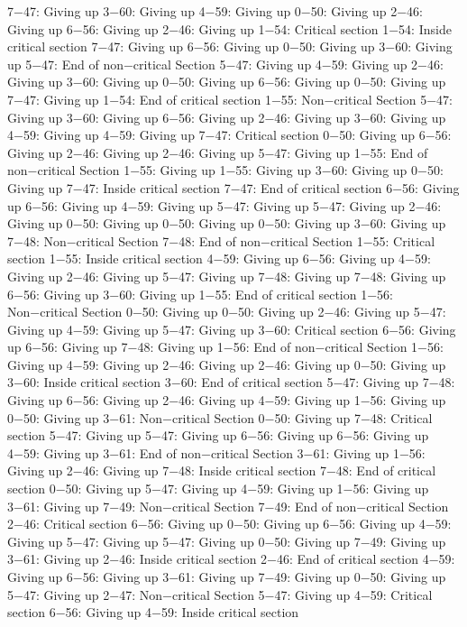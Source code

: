 7−47: Giving up
3−60: Giving up
4−59: Giving up
0−50: Giving up
2−46: Giving up
6−56: Giving up
2−46: Giving up
1−54: Critical section
1−54: Inside critical section
7−47: Giving up
6−56: Giving up
0−50: Giving up
3−60: Giving up
5−47: End of non−critical Section
5−47: Giving up
4−59: Giving up
2−46: Giving up
3−60: Giving up
0−50: Giving up
6−56: Giving up
0−50: Giving up
7−47: Giving up
1−54: End of critical section
1−55: Non−critical Section
5−47: Giving up
3−60: Giving up
6−56: Giving up
2−46: Giving up
3−60: Giving up
4−59: Giving up
4−59: Giving up
7−47: Critical section
0−50: Giving up
6−56: Giving up
2−46: Giving up
2−46: Giving up
5−47: Giving up
1−55: End of non−critical Section
1−55: Giving up
1−55: Giving up
3−60: Giving up
0−50: Giving up
7−47: Inside critical section
7−47: End of critical section
6−56: Giving up
6−56: Giving up
4−59: Giving up
5−47: Giving up
5−47: Giving up
2−46: Giving up
0−50: Giving up
0−50: Giving up
0−50: Giving up
3−60: Giving up
7−48: Non−critical Section
7−48: End of non−critical Section
1−55: Critical section
1−55: Inside critical section
4−59: Giving up
6−56: Giving up
4−59: Giving up
2−46: Giving up
5−47: Giving up
7−48: Giving up
7−48: Giving up
6−56: Giving up
3−60: Giving up
1−55: End of critical section
1−56: Non−critical Section
0−50: Giving up
0−50: Giving up
2−46: Giving up
5−47: Giving up
4−59: Giving up
5−47: Giving up
3−60: Critical section
6−56: Giving up
6−56: Giving up
7−48: Giving up
1−56: End of non−critical Section
1−56: Giving up
4−59: Giving up
2−46: Giving up
2−46: Giving up
0−50: Giving up
3−60: Inside critical section
3−60: End of critical section
5−47: Giving up
7−48: Giving up
6−56: Giving up
2−46: Giving up
4−59: Giving up
1−56: Giving up
0−50: Giving up
3−61: Non−critical Section
0−50: Giving up
7−48: Critical section
5−47: Giving up
5−47: Giving up
6−56: Giving up
6−56: Giving up
4−59: Giving up
3−61: End of non−critical Section
3−61: Giving up
1−56: Giving up
2−46: Giving up
7−48: Inside critical section
7−48: End of critical section
0−50: Giving up
5−47: Giving up
4−59: Giving up
1−56: Giving up
3−61: Giving up
7−49: Non−critical Section
7−49: End of non−critical Section
2−46: Critical section
6−56: Giving up
0−50: Giving up
6−56: Giving up
4−59: Giving up
5−47: Giving up
5−47: Giving up
0−50: Giving up
7−49: Giving up
3−61: Giving up
2−46: Inside critical section
2−46: End of critical section
4−59: Giving up
6−56: Giving up
3−61: Giving up
7−49: Giving up
0−50: Giving up
5−47: Giving up
2−47: Non−critical Section
5−47: Giving up
4−59: Critical section
6−56: Giving up
4−59: Inside critical section
